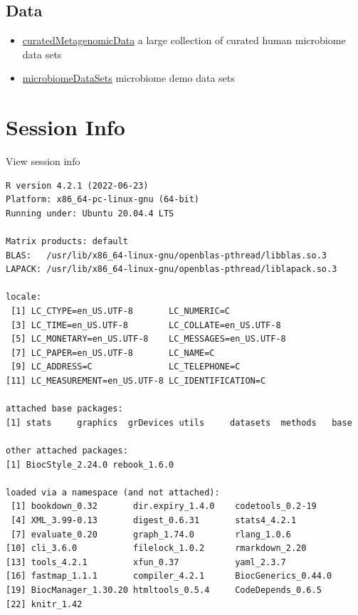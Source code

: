 \documentclass[
]{book}
\providecommand{\tightlist}{%
  \setlength{\itemsep}{0pt}\setlength{\parskip}{0pt}}
\begin{document}
\hypertarget{data}{%
\subsection{Data}\label{data}}

\begin{itemize}
\tightlist
\item
  \href{https://bioconductor.org/packages/release/data/experiment/html/curatedMetagenomicData.html}{curatedMetagenomicData} a large collection of curated human microbiome data sets
\item
  \href{https://bioconductor.org/packages/release/data/experiment/html/microbiomeDataSets.html}{microbiomeDataSets} microbiome demo data sets
\end{itemize}

\hypertarget{session-info-1}{%
\section*{Session Info}\label{session-info-1}}

View session info

\begin{verbatim}
R version 4.2.1 (2022-06-23)
Platform: x86_64-pc-linux-gnu (64-bit)
Running under: Ubuntu 20.04.4 LTS

Matrix products: default
BLAS:   /usr/lib/x86_64-linux-gnu/openblas-pthread/libblas.so.3
LAPACK: /usr/lib/x86_64-linux-gnu/openblas-pthread/liblapack.so.3

locale:
 [1] LC_CTYPE=en_US.UTF-8       LC_NUMERIC=C              
 [3] LC_TIME=en_US.UTF-8        LC_COLLATE=en_US.UTF-8    
 [5] LC_MONETARY=en_US.UTF-8    LC_MESSAGES=en_US.UTF-8   
 [7] LC_PAPER=en_US.UTF-8       LC_NAME=C                 
 [9] LC_ADDRESS=C               LC_TELEPHONE=C            
[11] LC_MEASUREMENT=en_US.UTF-8 LC_IDENTIFICATION=C       

attached base packages:
[1] stats     graphics  grDevices utils     datasets  methods   base     

other attached packages:
[1] BiocStyle_2.24.0 rebook_1.6.0    

loaded via a namespace (and not attached):
 [1] bookdown_0.32       dir.expiry_1.4.0    codetools_0.2-19   
 [4] XML_3.99-0.13       digest_0.6.31       stats4_4.2.1       
 [7] evaluate_0.20       graph_1.74.0        rlang_1.0.6        
[10] cli_3.6.0           filelock_1.0.2      rmarkdown_2.20     
[13] tools_4.2.1         xfun_0.37           yaml_2.3.7         
[16] fastmap_1.1.1       compiler_4.2.1      BiocGenerics_0.44.0
[19] BiocManager_1.30.20 htmltools_0.5.4     CodeDepends_0.6.5  
[22] knitr_1.42         
\end{verbatim}
\end{document}
